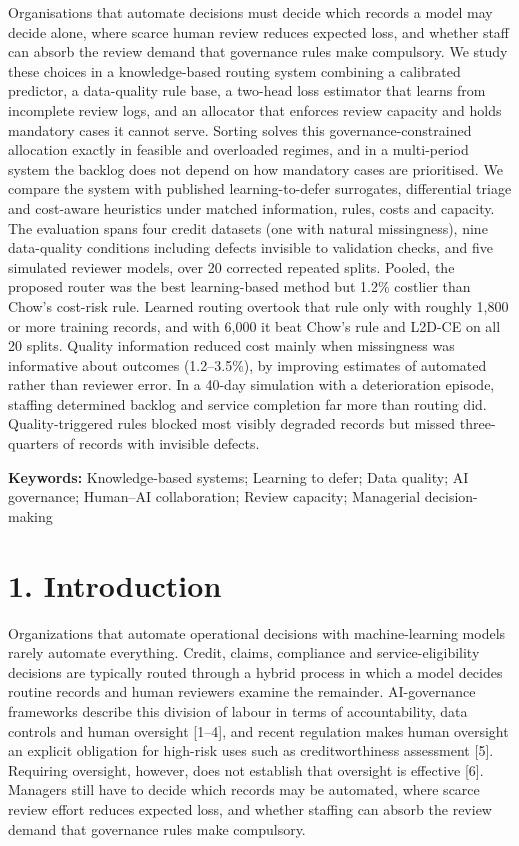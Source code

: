 \documentclass[
  11pt,
]{article}
\begin{document}
Organisations that automate decisions must decide which records a model
may decide alone, where scarce human review reduces expected loss, and
whether staff can absorb the review demand that governance rules make
compulsory. We study these choices in a knowledge-based routing system
combining a calibrated predictor, a data-quality rule base, a two-head
loss estimator that learns from incomplete review logs, and an allocator
that enforces review capacity and holds mandatory cases it cannot serve.
Sorting solves this governance-constrained allocation exactly in
feasible and overloaded regimes, and in a multi-period system the
backlog does not depend on how mandatory cases are prioritised. We
compare the system with published learning-to-defer surrogates,
differential triage and cost-aware heuristics under matched information,
rules, costs and capacity. The evaluation spans four credit datasets
(one with natural missingness), nine data-quality conditions including
defects invisible to validation checks, and five simulated reviewer
models, over 20 corrected repeated splits. Pooled, the proposed router
was the best learning-based method but 1.2\% costlier than Chow's
cost-risk rule. Learned routing overtook that rule only with roughly
1,800 or more training records, and with 6,000 it beat Chow's rule and
L2D-CE on all 20 splits. Quality information reduced cost mainly when
missingness was informative about outcomes (1.2--3.5\%), by improving
estimates of automated rather than reviewer error. In a 40-day
simulation with a deterioration episode, staffing determined backlog and
service completion far more than routing did. Quality-triggered rules
blocked most visibly degraded records but missed three-quarters of
records with invisible defects.

\textbf{Keywords:} Knowledge-based systems; Learning to defer; Data
quality; AI governance; Human--AI collaboration; Review capacity;
Managerial decision-making

\hypertarget{introduction}{%
\section{1. Introduction}\label{introduction}}

Organizations that automate operational decisions with machine-learning
models rarely automate everything. Credit, claims, compliance and
service-eligibility decisions are typically routed through a hybrid
process in which a model decides routine records and human reviewers
examine the remainder. AI-governance frameworks describe this division
of labour in terms of accountability, data controls and human oversight
{[}1--4{]}, and recent regulation makes human oversight an explicit
obligation for high-risk uses such as creditworthiness assessment
{[}5{]}. Requiring oversight, however, does not establish that oversight
is effective {[}6{]}. Managers still have to decide which records may be
automated, where scarce review effort reduces expected loss, and whether
staffing can absorb the review demand that governance rules make
compulsory.
\end{document}
